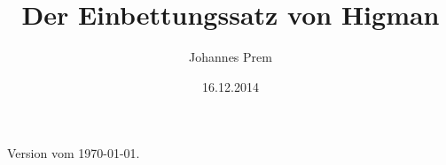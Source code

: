 
\subject{Seminar: Das Wortproblem}
\title{Der Einbettungssatz von Higman}
\author{Johannes Prem}
\date{16.12.2014}

\maketitle
\thispagestyle{empty}

\vfill
\begin{center}\footnotesize%
    Version vom \today.
\end{center}
\newpage

